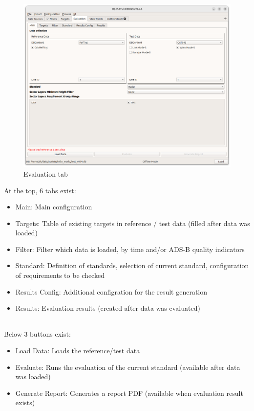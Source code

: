 \begin{figure}[H]
    \hspace*{-2.5cm}
    \includegraphics[width=19cm]{figures/eval.png}
  \caption{Evaluation tab}
\end{figure}

At the top, 6 tabs exist:
\begin{itemize}  
\item Main: Main configuration
\item Targets: Table of existing targets in reference / test data (filled after data was loaded)
\item Filter: Filter which data is loaded, by time and/or ADS-B quality indicators
\item Standard: Definition of standards, selection of current standard, configuration of requirements to be checked
\item Results Config: Additional configration for the result generation
\item Results: Evaluation results (created after data was evaluated)
\end{itemize}
\ \\

Below 3 buttons exist:
\begin{itemize}  
\item Load Data: Loads the reference/test data
\item Evaluate: Runs the evaluation of the current standard (available after data was loaded)
\item Generate Report: Generates a report PDF (available when evaluation result exists)
\end{itemize}
\ \\

